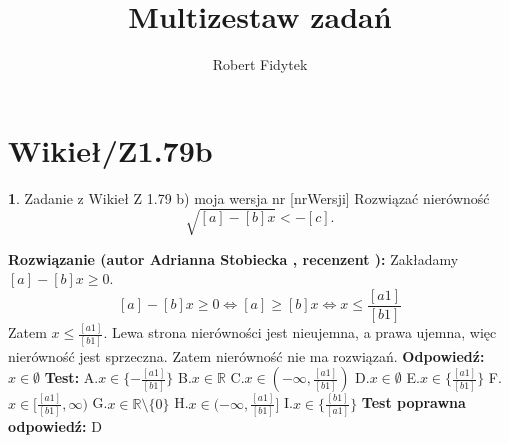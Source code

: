 \documentclass[12pt, a4paper]{article}
\title{Multizestaw zadań}
\author{Robert Fidytek}
\date{}
\theoremstyle{definition} %
\newtheorem{zad}{}
\newcommand{\kategoria}[1]{\section{#1}} %
\newcommand{\zadStart}[1]{\begin{zad}#1\newline} %
\newcommand{\zadStop}{\end{zad}}   %
\newcommand{\rozwStart}[2]{\noindent \textbf{Rozwiązanie (autor #1 , recenzent #2): }\newline} %
\newcommand{\rozwStop}{\newline}                                            %
\newcommand{\odpStart}{\noindent \textbf{Odpowiedź:}\newline}    %
\newcommand{\odpStop}{\newline}                                             %
\newcommand{\testStart}{\noindent \textbf{Test:}\newline} %
\newcommand{\testStop}{\newline} %
\newcommand{\kluczStart}{\noindent \textbf{Test poprawna odpowiedź:}\newline} %
\newcommand{\kluczStop}{\newline} %
\begin{document}
\maketitle


\kategoria{Wikieł/Z1.79b}
\zadStart{Zadanie z Wikieł Z 1.79 b) moja wersja nr [nrWersji]}
Rozwiązać nierówność
$$\sqrt{[a]-[b]x}<-[c].$$
\zadStop
\rozwStart{Adrianna Stobiecka}{}
Zakładamy $[a]-[b]x\geq0$.
$$[a]-[b]x\geq0\Leftrightarrow[a]\geq[b]x\Leftrightarrow x\leq\frac{[a1]}{[b1]}$$
Zatem $x\leq\frac{[a1]}{[b1]}$. Lewa strona nierówności jest nieujemna, a prawa ujemna, więc nierówność jest sprzeczna. Zatem nierówność nie ma rozwiązań.
\rozwStop
\odpStart
$x\in\emptyset$
\odpStop
\testStart
A.$x\in\{-\frac{[a1]}{[b1]}\}$
B.$x\in\mathbb{R}$
C.$x\in(-\infty,\frac{[a1]}{[b1]})$
D.$x\in\emptyset$
E.$x\in\{\frac{[a1]}{[b1]}\}$
F.$x\in[\frac{[a1]}{[b1]},\infty)$
G.$x\in\mathbb{R}\setminus\{0\}$
H.$x\in(-\infty,\frac{[a1]}{[b1]}]$
I.$x\in\{\frac{[b1]}{[a1]}\}$
\testStop
\kluczStart
D
\kluczStop
\end{document}
